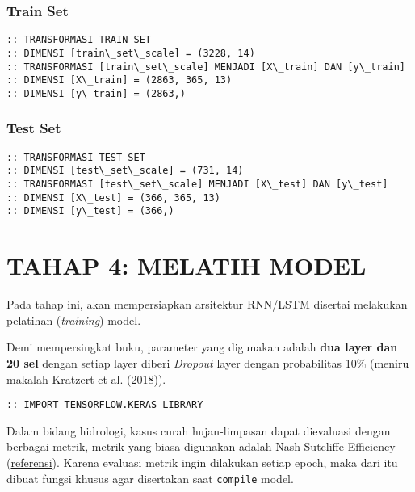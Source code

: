 \documentclass[11pt]{article}
\let\oldsection\section
\renewcommand\section{\clearpage\oldsection}
\begin{document}
    \hypertarget{train-set}{%
\subsubsection{Train Set}\label{train-set}}

    \begin{Verbatim}[commandchars=\\\{\}]
:: TRANSFORMASI TRAIN SET
:: DIMENSI [train\_set\_scale] = (3228, 14)
:: TRANSFORMASI [train\_set\_scale] MENJADI [X\_train] DAN [y\_train]
:: DIMENSI [X\_train] = (2863, 365, 13)
:: DIMENSI [y\_train] = (2863,)
    \end{Verbatim}

    \hypertarget{test-set}{%
\subsubsection{Test Set}\label{test-set}}

    \begin{Verbatim}[commandchars=\\\{\}]
:: TRANSFORMASI TEST SET
:: DIMENSI [test\_set\_scale] = (731, 14)
:: TRANSFORMASI [test\_set\_scale] MENJADI [X\_test] DAN [y\_test]
:: DIMENSI [X\_test] = (366, 365, 13)
:: DIMENSI [y\_test] = (366,)
    \end{Verbatim}

    \hypertarget{tahap-4-melatih-model}{%
\section{TAHAP 4: MELATIH MODEL}\label{tahap-4-melatih-model}}

Pada tahap ini, akan mempersiapkan arsitektur RNN/LSTM disertai
melakukan pelatihan (\emph{training}) model.

Demi mempersingkat buku, parameter yang digunakan adalah \textbf{dua
layer dan 20 sel} dengan setiap layer diberi \emph{Dropout} layer dengan
probabilitas 10\% (meniru makalah Kratzert et al. (2018)).

    \begin{Verbatim}[commandchars=\\\{\}]
:: IMPORT TENSORFLOW.KERAS LIBRARY
    \end{Verbatim}

    Dalam bidang hidrologi, kasus curah hujan-limpasan dapat dievaluasi
dengan berbagai metrik, metrik yang biasa digunakan adalah
Nash-Sutcliffe Efficiency
(\href{https://en.wikipedia.org/wiki/Nash–Sutcliffe_model_efficiency_coefficient}{referensi}).
Karena evaluasi metrik ingin dilakukan setiap epoch, maka dari itu
dibuat fungsi khusus agar disertakan saat \texttt{compile} model.
\end{document}
